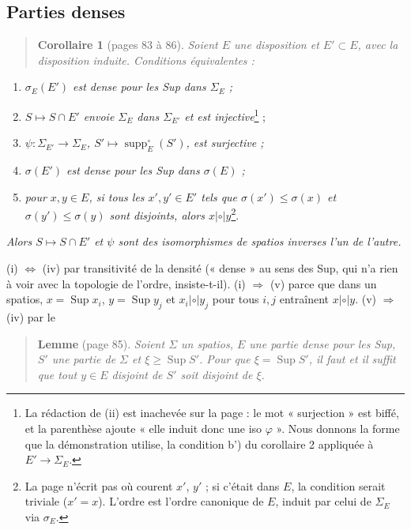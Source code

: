 \documentclass[11pt,a4paper]{article}
\begin{document}
\subsection*{Parties denses}

\begin{quote}
\textbf{Corollaire 1} (pages 83 à 86). \emph{Soient $E$ une disposition et $E'
\subset E$, avec la disposition induite. Conditions équivalentes :}
\end{quote}
\begin{enumerate}
\item[(i)] \emph{$\sigma_{E}(E')$ est dense pour les Sup dans $\Sigma_{E}$ ;}
\item[(ii)] \emph{$S \mapsto S \cap E'$ envoie $\Sigma_{E}$ dans $\Sigma_{E'}$ et
est injective}\footnote{La rédaction de (ii) est inachevée sur la page : le mot
« surjection » est biffé, et la parenthèse ajoute « elle induit donc une iso
$\varphi$ ». Nous donnons la forme que la démonstration utilise, la condition b')
du corollaire 2 appliquée à $E' \to \Sigma_{E}$.} ;
\item[(iii)] \emph{$\psi : \Sigma_{E'} \to \Sigma_{E}$, $S' \mapsto
\operatorname{supp}^{\circ}_{E}(S')$, est surjective ;}
\item[(iv)] \emph{$\sigma(E')$ est dense pour les Sup dans $\sigma(E)$ ;}
\item[(v)] \emph{pour $x, y \in E$, si tous les $x', y' \in E'$ tels que $\sigma(x')
\leq \sigma(x)$ et $\sigma(y') \leq \sigma(y)$ sont disjoints, alors $x
\mathrel{|\circ|} y$}\footnote{La page n'écrit pas où courent $x'$, $y'$ ; si
c'était dans $E$, la condition serait triviale ($x' = x$). L'ordre est l'ordre
canonique de $E$, induit par celui de $\Sigma_{E}$ via $\sigma_{E}$.}.
\end{enumerate}
\emph{Alors $S \mapsto S \cap E'$ et $\psi$ sont des isomorphismes de spatios
inverses l'un de l'autre.}

(i) $\iff$ (iv) par transitivité de la densité (« dense » au sens des Sup, qui
n'a rien à voir avec la topologie de l'ordre, insiste-t-il). (i) $\Rightarrow$ (v)
parce que dans un spatios, $x = \operatorname{Sup}x_{i}$, $y =
\operatorname{Sup}y_{j}$ et $x_{i} \mathrel{|\circ|} y_{j}$ pour tous $i, j$
entraînent $x \mathrel{|\circ|} y$. (v) $\Rightarrow$ (iv) par le

\begin{quote}
\textbf{Lemme} (page 85). \emph{Soient $\Sigma$ un spatios, $E$ une partie dense
pour les Sup, $S'$ une partie de $\Sigma$ et $\xi \geq \operatorname{Sup}S'$.
Pour que $\xi = \operatorname{Sup}S'$, il faut et il suffit que tout $y \in E$
disjoint de $S'$ soit disjoint de $\xi$.}
\end{quote}
\end{document}

